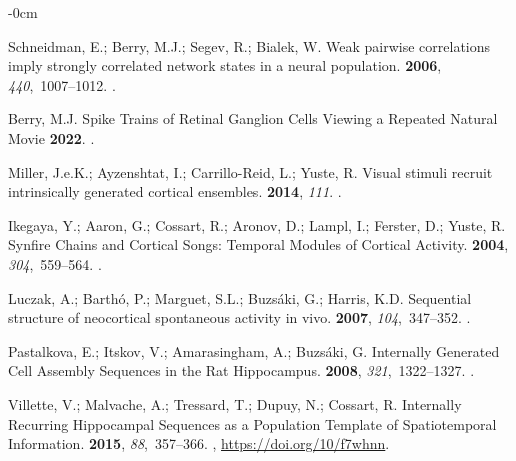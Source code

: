 \documentclass[brainsci, %
               review,submit,pdftex,moreauthors
               ]{Definitions/mdpi}
\begin{document}
\begin{adjustwidth}{-\extralength}{0cm}
\begin{thebibliography}{999}
  Schneidman, E.; Berry, M.J.; Segev, R.; Bialek, W.
  \newblock Weak pairwise correlations imply strongly correlated network states
    in a neural population.
   {\bf 2006}, {\em 440},~1007--1012.
  .
  
  Berry, M.J.
  \newblock Spike {Trains} of {Retinal} {Ganglion} {Cells} {Viewing} a {Repeated}
    {Natural} {Movie} {\bf 2022}.
  .
  
  Miller, J.e.K.; Ayzenshtat, I.; Carrillo-Reid, L.; Yuste, R.
  \newblock Visual stimuli recruit intrinsically generated cortical ensembles.
   {\bf 2014},
    {\em 111}.
  .
  
  Ikegaya, Y.; Aaron, G.; Cossart, R.; Aronov, D.; Lampl, I.; Ferster, D.; Yuste,
    R.
  \newblock Synfire {Chains} and {Cortical} {Songs}: {Temporal} {Modules} of
    {Cortical} {Activity}.
   {\bf 2004}, {\em 304},~559--564.
  .
  
  Luczak, A.; Barthó, P.; Marguet, S.L.; Buzsáki, G.; Harris, K.D.
  \newblock Sequential structure of neocortical spontaneous activity in vivo.
   {\bf 2007},
    {\em 104},~347--352.
  .
  
  Pastalkova, E.; Itskov, V.; Amarasingham, A.; Buzsáki, G.
  \newblock Internally {Generated} {Cell} {Assembly} {Sequences} in the {Rat}
    {Hippocampus}.
   {\bf 2008}, {\em 321},~1322--1327.
  .
  
  Villette, V.; Malvache, A.; Tressard, T.; Dupuy, N.; Cossart, R.
  \newblock Internally {Recurring} {Hippocampal} {Sequences} as a {Population}
    {Template} of {Spatiotemporal} {Information}.
   {\bf 2015}, {\em 88},~357--366.
  , {\url{https://doi.org/10/f7whnn}}.
  

\end{thebibliography}
\end{adjustwidth}
\end{document}
